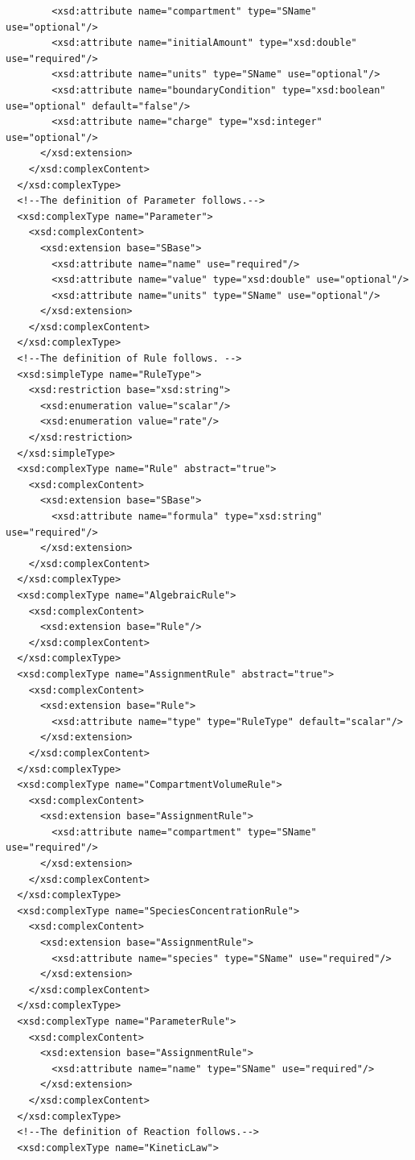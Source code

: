 \documentclass[10pt]{cekarticle}
\begin{document}
\begin{small}
\begin{verbatim}
        <xsd:attribute name="compartment" type="SName" use="optional"/>
        <xsd:attribute name="initialAmount" type="xsd:double" use="required"/>
        <xsd:attribute name="units" type="SName" use="optional"/>
        <xsd:attribute name="boundaryCondition" type="xsd:boolean" use="optional" default="false"/>
        <xsd:attribute name="charge" type="xsd:integer" use="optional"/>
      </xsd:extension>
    </xsd:complexContent>
  </xsd:complexType>
  <!--The definition of Parameter follows.-->
  <xsd:complexType name="Parameter">
    <xsd:complexContent>
      <xsd:extension base="SBase">
        <xsd:attribute name="name" use="required"/>
        <xsd:attribute name="value" type="xsd:double" use="optional"/>
        <xsd:attribute name="units" type="SName" use="optional"/>
      </xsd:extension>
    </xsd:complexContent>
  </xsd:complexType>
  <!--The definition of Rule follows. -->
  <xsd:simpleType name="RuleType">
    <xsd:restriction base="xsd:string">
      <xsd:enumeration value="scalar"/>
      <xsd:enumeration value="rate"/>
    </xsd:restriction>
  </xsd:simpleType>
  <xsd:complexType name="Rule" abstract="true">
    <xsd:complexContent>
      <xsd:extension base="SBase">
        <xsd:attribute name="formula" type="xsd:string" use="required"/>
      </xsd:extension>
    </xsd:complexContent>
  </xsd:complexType>
  <xsd:complexType name="AlgebraicRule">
    <xsd:complexContent>
      <xsd:extension base="Rule"/>
    </xsd:complexContent>
  </xsd:complexType>
  <xsd:complexType name="AssignmentRule" abstract="true">
    <xsd:complexContent>
      <xsd:extension base="Rule">
        <xsd:attribute name="type" type="RuleType" default="scalar"/>
      </xsd:extension>
    </xsd:complexContent>
  </xsd:complexType>
  <xsd:complexType name="CompartmentVolumeRule">
    <xsd:complexContent>
      <xsd:extension base="AssignmentRule">
        <xsd:attribute name="compartment" type="SName" use="required"/>
      </xsd:extension>
    </xsd:complexContent>
  </xsd:complexType>
  <xsd:complexType name="SpeciesConcentrationRule">
    <xsd:complexContent>
      <xsd:extension base="AssignmentRule">
        <xsd:attribute name="species" type="SName" use="required"/>
      </xsd:extension>
    </xsd:complexContent>
  </xsd:complexType>
  <xsd:complexType name="ParameterRule">
    <xsd:complexContent>
      <xsd:extension base="AssignmentRule">
        <xsd:attribute name="name" type="SName" use="required"/>
      </xsd:extension>
    </xsd:complexContent>
  </xsd:complexType>
  <!--The definition of Reaction follows.-->
  <xsd:complexType name="KineticLaw">

\end{verbatim}
\end{small}
\end{document}
